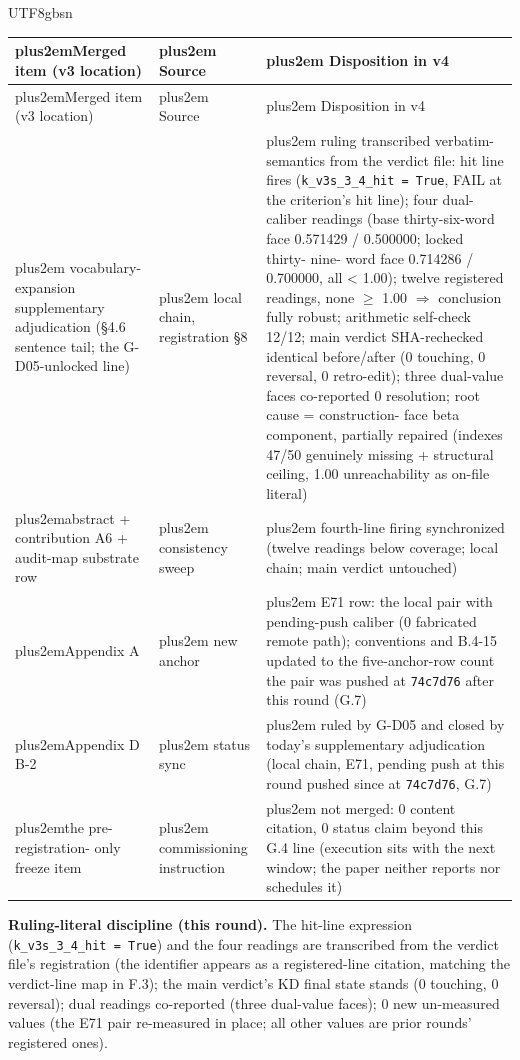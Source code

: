 \documentclass[11pt,letterpaper]{article}
\newcommand{\RaggedRight}{\rightskip=0pt plus2em\relax}
\begin{document}
\begin{CJK}{UTF8}{gbsn}
{\small\linespread{0.92}\selectfont\begin{longtable}{>{\RaggedRight\arraybackslash}p{4.57cm} >{\RaggedRight\arraybackslash}p{4.57cm} >{\RaggedRight\arraybackslash}p{4.57cm}}
\toprule
Merged item (v3 location) & Source & Disposition in v4 \\
\midrule
\endfirsthead
\toprule
Merged item (v3 location) & Source & Disposition in v4 \\
\midrule
\endhead
\endfoot
\bottomrule
\endlastfoot
vocabulary-\penalty-100 expansion supplementary adjudication (\S{}4.6 sentence tail; the G-D05-unlocked line) & local chain, registration \S{}8 & ruling transcribed verbatim-\penalty-100 semantics from the verdict file: hit line fires (\texttt{k\_v3s\_3\_4\_hit = True}, FAIL at the criterion's hit line); four dual-caliber readings (base thirty-six-word face 0.571429 / 0.500000; locked thirty-\penalty-100 nine-\penalty-100 word face 0.714286 / 0.700000, all < 1.00); twelve registered readings, none \ensuremath{\geq} 1.00 \ensuremath{\Rightarrow} conclusion fully robust; arithmetic self-check 12/12; main verdict SHA-rechecked identical before/after (0 touching, 0 reversal, 0 retro-edit); three dual-value faces co-reported 0 resolution; root cause = construction-\penalty-100 face beta component, partially repaired (indexes 47/50 genuinely missing + structural ceiling, 1.00 unreachability as on-file literal) \\
abstract + contribution A6 + audit-map substrate row & consistency sweep & fourth-line firing synchronized (twelve readings below coverage; local chain; main verdict untouched) \\
Appendix A & new anchor & E71 row: the local pair with pending-push caliber (0 fabricated remote path); conventions and B.4-15 updated to the five-anchor-row count \textemdash{} the pair was pushed at \texttt{74c7d76} after this round (G.7) \\
Appendix D B-2 & status sync & ruled by G-D05 and closed by today's supplementary adjudication (local chain, E71, pending push at this round \textemdash{} pushed since at \texttt{74c7d76}, G.7) \\
the pre-\penalty-100 registration-\penalty-100 only freeze item & commissioning instruction & not merged: 0 content citation, 0 status claim beyond this G.4 line (execution sits with the next window; the paper neither reports nor schedules it) \\
\end{longtable}}

\textbf{Ruling-literal discipline (this round).} The hit-line expression (\texttt{k\_v3s\_3\_4\_hit = True}) and the four readings are transcribed from the verdict file's registration (the identifier appears as a registered-line citation, matching the verdict-line map in F.3); the main verdict's KD final state stands (0 touching, 0 reversal); dual readings co-reported (three dual-value faces); 0 new un-measured values (the E71 pair re-measured in place; all other values are prior rounds' registered ones).


\end{CJK}
\end{document}
